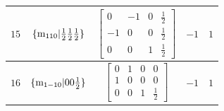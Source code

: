 \documentclass[fleqn,8pt]{jsarticle}
\begin{document}
\begin{longtable}{ccccc}
$ 15 $ & $ \{{\rm m}_{110}|\frac{1}{2} \frac{1}{2} \frac{1}{2}\} $ & $ \begin{bmatrix} 0 & -1 & 0 & \frac{1}{2} \\ -1 & 0 & 0 & \frac{1}{2} \\ 0 & 0 & 1 & \frac{1}{2} \end{bmatrix} $ & $ -1 $ & $ 1 $ \\ \hline
$ 16 $ & $ \{{\rm m}_{1-10}|0 0 \frac{1}{2}\} $ & $ \begin{bmatrix} 0 & 1 & 0 & 0 \\ 1 & 0 & 0 & 0 \\ 0 & 0 & 1 & \frac{1}{2} \end{bmatrix} $ & $ -1 $ & $ 1 $ \\
\end{longtable}
\end{document}
